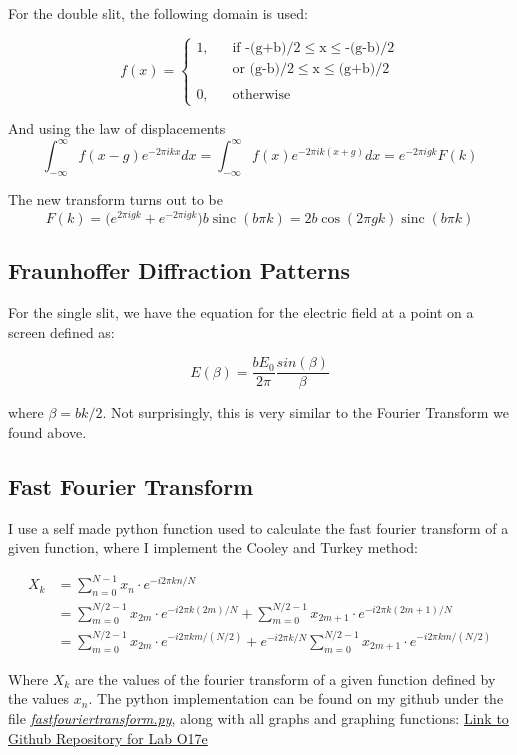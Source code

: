 \documentclass{article}
\begin{document}
For the double slit, the following domain is used:

\[
f(x) =
  \begin{cases}
    \text{1,} &\quad\text{if -(g+b)/2}\le\text{x}\le\text{-(g-b)/2} \\
     &\quad\text{or (g-b)/2}\le\text{x}\le\text{(g+b)/2} \\ \\
    \text{0,} &\quad\text{otherwise}
  \end{cases}
\]

And using the law of displacements
$$ \int_{-\infty}^{\infty} f(x-g)e^{-2\pi ikx}dx = \int_{-\infty}^{\infty} f(x)e^{-2\pi ik(x+g)} dx = e^{-2\pi ig k} F(k) $$

The new transform turns out to be
$$ F(k) = \big( e^{2\pi i gk} + e^{-2\pi i gk}\big)b\operatorname{sinc}(b\pi k) = 2b\cos(2\pi gk)\operatorname{sinc}(b\pi k) $$

\subsection{Fraunhoffer Diffraction Patterns}
For the single slit, we have the equation for the electric field at a point on a screen defined as:

$$E(\beta) = \frac{bE_0}{2\pi}\frac{sin(\beta)}{\beta}  $$

where $\beta = bk/2$. Not surprisingly, this is very similar to the Fourier Transform we found above.


\subsection{Fast Fourier Transform}
I use a self made python function used to calculate the fast fourier transform of a given function, where I implement the Cooley and Turkey method:

\begin{align}
X_k &= \sum_{n=0}^{N-1} x_n \cdot e^{-i 2\pi k n / N} \\
    &= \sum_{m=0}^{N/2-1}x_{2m} \cdot e^{-i 2\pi k (2m) / N} +\sum_{m=0}^{N/2-1}x_{2m+1} \cdot e^{-i 2\pi k (2m+1) / N} \\
    &= \sum_{m=0}^{N/2-1}x_{2m} \cdot e^{-i 2\pi k m / (N/2)} + e^{-i 2\pi k / N} \sum_{m=0}^{N/2-1}x_{2m+1} \cdot e^{-i 2\pi k m / (N/2)}
\end{align}

Where $X_k$ are the values of the fourier transform of a given function defined by the values $x_n$. The python implementation can be found on my github under the file \href{https://github.com/fusionby2030/Numerical_Methods/tree/master/Labs/017E/fastfouriertransform.py}{\textit{fastfouriertransform.py}}, along with all graphs and graphing functions: \href{https://github.com/fusionby2030/Numerical_Methods/tree/master/Labs/017E}{Link to Github Repository for Lab O17e}
\end{document}
